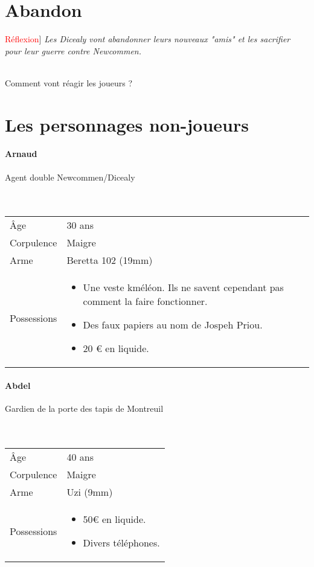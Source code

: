 \documentclass[10pt,a4paper,twocolumn]{article}
\newenvironment{lAbstract}[1]{{[}\textcolor{red}{#1}{]}\itshape}{\\ \\}
\begin{document}
\section{Abandon}
\begin{lAbstract}{Réflexion}
Les Dicealy vont abandonner leurs nouveaux "amis" et les sacrifier pour leur guerre contre Newcommen.
\end{lAbstract}

 Comment vont réagir les joueurs ?
\newpage
\section*{Les personnages non-joueurs}
\hypertarget{arnaud}{\paragraph{Arnaud}} Agent double Newcommen/Dicealy\\ \\
\
\begin{tabular}{l|p{}}
	Âge & 30 ans\\
	Corpulence & Maigre \\
	Arme & Beretta 102 (19mm) \\
	Possessions & \begin{itemize}
	\item Une veste kméléon. Ils ne savent cependant pas comment la faire fonctionner.
	\item Des faux papiers au nom de Jospeh Priou.
	\item 20 € en liquide.
\end{itemize} \\
\end{tabular}
\hypertarget{abdel}{\paragraph{Abdel}} Gardien de la porte des tapis de Montreuil\\ \\
\
\begin{tabular}{l|p{0.3\textwidth}}
	Âge & 40 ans\\
	Corpulence & Maigre \\
	Arme & Uzi (9mm) \\
	Possessions & \begin{itemize}
	\item 50€ en liquide.
	\item Divers téléphones.
\end{itemize}	 \\
\end{tabular}
\end{document}
